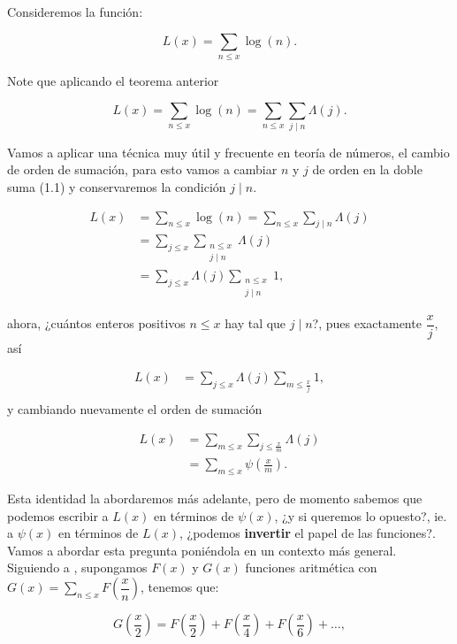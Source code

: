 Consideremos la función: 

$$L(x)=\sum_{n\leq x}\log(n).$$

Note que aplicando el teorema anterior

\begin{equation}
L(x)=\sum_{n\leq x}\log(n)=\sum_{n\leq x}\sum_{j\mid n}\Lambda(j).
\end{equation}

Vamos a aplicar una técnica muy útil y frecuente en teoría de números, el cambio de orden de sumación, para esto vamos a cambiar $n$ y $j$ de orden en la doble suma (1.1) y conservaremos la condición $j\mid n$.

\begin{align*}
    L(x)&=\sum_{n\leq x}\log(n)=\sum_{n\leq x}\sum_{j\mid n}\Lambda(j)\\
    &=\sum_{j \leq x} \sum_{\substack{n \leq x \\
j \mid n}} \Lambda(j)\\
&=\sum_{j \leq x} \Lambda(j) \sum_{\substack{n \leq x \\
j \mid n}} 1
,\end{align*}

ahora, ¿cuántos enteros positivos $n\leq x$ hay tal que $j\mid n$?, pues exactamente $\dfrac{x}{j}$, así

\begin{align*}
    L(x)&=\sum_{j\leq x}\Lambda(j)\sum_{m\leq \frac{x}{j}}1,\\
\end{align*}
y cambiando nuevamente el orden de sumación

\begin{align*}
    L(x)&=\sum_{m\leq x}\sum_{j\leq \frac{x}{m}}\Lambda(j)\\
    &=\sum_{m\leq x}\psi\left(\frac{x}{m}\right).
\end{align*}

Esta identidad la abordaremos más adelante, pero de momento sabemos que podemos escribir a $L(x)$ en términos de $\psi(x)$, ¿y si queremos lo opuesto?, ie. a $\psi(x)$ en términos de  $L(x)$, ¿podemos \textbf{invertir} el papel de las funciones?. Vamos a abordar esta pregunta poniéndola en un contexto más general.\\

Siguiendo a \cite{levinson1969motivated}, supongamos $F(x)$ y $G(x)$ funciones aritmética con $G(x)=\displaystyle\sum_{n\leq x}F\left(\dfrac{x}{n}\right)$, tenemos que:

$$G \left( \frac{x}{2} \right)=F \left( \dfrac{x}{2} \right)+F \left( \frac{x}{4} \right)+F \left( \frac{x}{6} \right)+\ldots,$$


